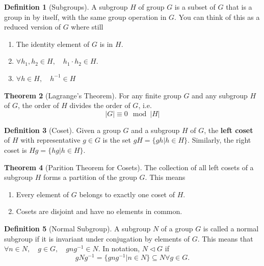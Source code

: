 \documentclass[12pt]{article}
\theoremstyle{definition}
\newtheorem{theorem}{Theorem}[section]
\newtheorem{definition}[theorem]{Definition}
\begin{document}
\begin{definition}[Subgroups]
    A subgroup $H$ of group $G$ is a subset of $G$ that is a group in by itself, with the same group operation in $G$. You can think of this as a reduced version of $G$ where still 
    \begin{enumerate}
        \item The identity element of $G$ is in $H$.
        \item $\forall h_1, h_2 \in H, \quad h_1 \cdot h_2 \in H$.
        \item $\forall h \in H, \quad h^{-1} \in H$
    \end{enumerate}
\end{definition}

\begin{theorem}[Lagrange's Theorem]
    For any finite group $G$ and any subgroup $H$ of $G$, the order of $H$ divides the order of $G$, i.e. $$\vert G \vert \equiv 0 \mod \vert H \vert$$
\end{theorem}
\vspace{12pt}


\begin{definition}[Coset]
    Given a group $G$ and a subgroup $H$ of $G$, the \textbf{left coset} of $H$ with representative $g \in G$ is the set $gH = \{gh \vert h \in H\}$. Similarly, the right coset is $Hg = \{hg \vert h \in H\}$.
\end{definition}

\begin{theorem}[Parition Theorem for Cosets]
    The collection of all left cosets of a subgroup $H$ forms a partition of the group $G$. This means 
    \begin{enumerate}
        \item Every element of $G$ belongs to exactly one coset of $H$.
        \item Cosets are disjoint and have no elements in common.
    \end{enumerate}
\end{theorem}

\begin{definition}[Normal Subgroup]
    A subgroup $N$ of a group $G$ is called a normal subgroup if it is invariant under conjugation by elements of $G$. This means that $\forall n \in N, \quad g \in G, \quad gng^{-1} \in N$. In notation, $N \triangleleft G$ if $$gNg^{-1} = \{gng^{-1} \vert n \in N\} \subseteq N \forall g \in G.$$
\end{definition}
\end{document}
